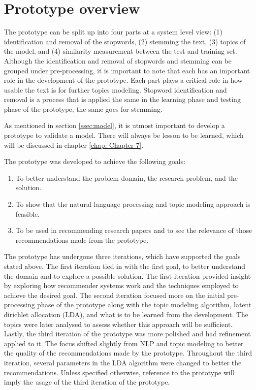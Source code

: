 \section{Prototype overview}

The prototype can be split up into four parts at a system level view: (1) identification and removal of the stopwords, (2) stemming the text, (3) topics of the model, and (4) similarity measurement between the test and training set. Although the identification and removal of stopwords and stemming can be grouped under pre-processing, it is important to note that each has an important role in the development of the prototype. Each part plays a critical role in how usable the text is for further topics modeling. Stopword identification and removal is a process that is applied the same in the learning phase and testing phase of the prototype, the same goes for stemming.

As mentioned in section \ref{ssec:model}, it is utmost important to develop a prototype to validate a model. There will always be lesson to be learned, which will be discussed in chapter \ref{chap: Chapter 7}.

The prototype was developed to achieve the following goals:

\begin{enumerate}
    \item To better understand the problem domain, the research problem, and the solution.
    \item To show that the natural language processing and topic modeling approach is feasible.
    \item To be used in recommending research papers and to see the relevance of those recommendations made from the prototype.
\end{enumerate}

The prototype has undergone three iterations, which have supported the goals stated above. The first iteration tied in with the first goal, to better understand the domain and to explore a possible solution. The first iteration provided insight by exploring how recommender systems work and the techniques employed to achieve the desired goal. The second iteration focused more on the initial pre-processing phase of the prototype along with the topic modeling algorithm, latent dirichlet allocation (LDA), and what is to be learned from the development. The topics were later analysed to assess whether this approach will be sufficient. Lastly, the third iteration of the prototype was more polished and had refinement applied to it. The focus shifted slightly from NLP and topic modeling to better the quality of the recommendations made by the prototype. Throughout the third iteration, several parameters in the LDA algorithm were changed to better the recommendations. Unless specified otherwise, reference to the prototype will imply the usage of the third iteration of the prototype.

